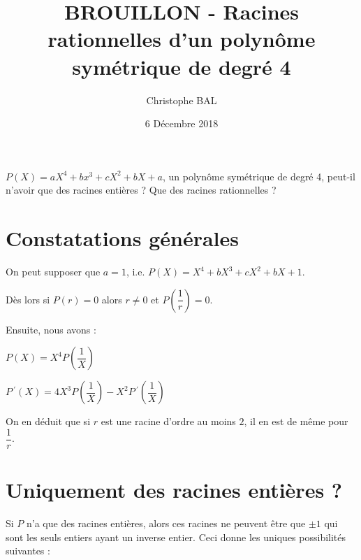 \documentclass[12pt]{amsart}
\begin{document}
\title{BROUILLON - Racines rationnelles d'un polynôme symétrique de degré 4}
\author{Christophe BAL}
\date{6 Décembre 2018}
\maketitle

$P(X) = a X^4 + b x^3 + c X^2 + b X + a$, un polynôme symétrique de degré 4, peut-il n'avoir que des racines entières ? Que des racines rationnelles ?



\section{Constatations générales}

On peut supposer que $a = 1$, i.e. $P(X) = X^4 + b X^3 + c X^2 + b X + 1$.

Dès lors si $P(r) = 0$ alors $r \neq 0$ et $P\left( \dfrac1r \right) = 0$.

Ensuite, nous avons :

\medskip

$P(X) = X^4 P\left( \dfrac1X \right)$

\medskip

$P\,^{\prime}(X) = 4 X^3 P\left( \dfrac1X \right) 
            - X^2 P\,^{\prime}\left( \dfrac1X \right)$

%
%

On en déduit que si $r$ est une racine d'ordre au moins $2$, il en est de même pour $\dfrac1r$.


\section{Uniquement des racines entières ?}

Si $P$ n'a que des racines entières, alors ces racines ne peuvent être que $\pm 1$ qui sont les seuls entiers ayant un inverse entier. Ceci donne les uniques  possibilités suivantes :
\end{document}
